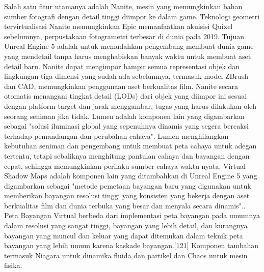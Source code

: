 Salah satu fitur utamanya adalah Nanite, mesin yang memungkinkan bahan sumber fotografi dengan detail tinggi diimpor ke dalam game.\citep{ValentineRebekah} Teknologi geometri tervirtualisasi Nanite memungkinkan Epic memanfaatkan akuisisi Quixel sebelumnya, perpustakaan fotogrametri terbesar di dunia pada 2019. Tujuan Unreal Engine 5 adalah untuk memudahkan pengembang 
membuat dunia game yang mendetail tanpa harus menghabiskan banyak waktu untuk membuat aset detail baru.\citep{DeanTakahashi} Nanite dapat mengimpor hampir semua representasi objek dan lingkungan tiga dimensi yang sudah ada sebelumnya, termasuk model ZBrush dan CAD, memungkinkan penggunaan aset berkualitas film.\citep{AndrewTarantola} Nanite secara otomatis menangani tingkat detail (LODs) 
dari objek yang diimpor ini sesuai dengan platform target dan jarak menggambar, tugas yang harus dilakukan oleh seorang seniman jika tidak.\citep{KyleOrland} Lumen adalah komponen lain yang digambarkan sebagai "solusi iluminasi global yang sepenuhnya dinamis yang segera bereaksi terhadap pemandangan dan perubahan cahaya". Lumen menghilangkan kebutuhan 
seniman dan pengembang untuk membuat peta cahaya untuk adegan tertentu, tetapi sebaliknya menghitung pantulan cahaya dan bayangan dengan cepat, sehingga memungkinkan perilaku sumber cahaya waktu nyata.\citep{KyleOrland} Virtual Shadow Maps adalah komponen lain yang ditambahkan di Unreal Engine 5 yang digambarkan sebagai "metode pemetaan bayangan baru yang digunakan 
untuk memberikan bayangan resolusi tinggi yang konsisten yang bekerja dengan aset berkualitas film dan dunia terbuka yang besar dan menyala secara dinamis"..\citep{VirtualShadowMaps} Peta Bayangan Virtual berbeda dari implementasi peta bayangan pada umumnya dalam resolusi yang sangat tinggi, bayangan yang lebih detail, dan kurangnya bayangan yang muncul dan keluar yang 
dapat ditemukan dalam teknik peta bayangan yang lebih umum karena kaskade bayangan.[121] Komponen tambahan termasuk Niagara untuk dinamika fluida dan partikel dan Chaos untuk mesin fisika.\citep{DeanTakahashi}
